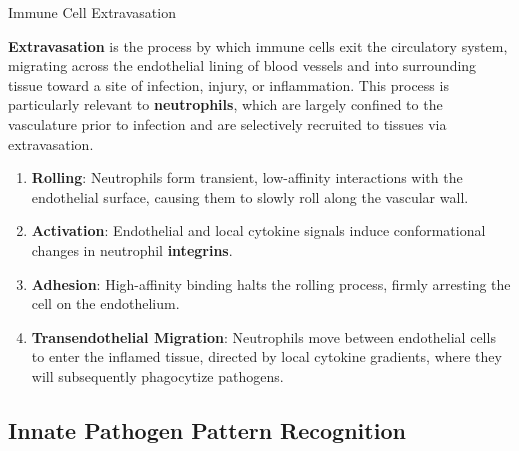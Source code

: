     \begin{core}{Immune Cell Extravasation}

      \textbf{Extravasation} is the process by which immune cells exit the circulatory system, migrating across the endothelial lining of blood vessels and into surrounding tissue toward a site of infection, injury, or inflammation. This process is particularly relevant to \textbf{neutrophils}, which are largely confined to the vasculature prior to infection and are selectively recruited to tissues via extravasation.


      \begin{enumerate}[label=(\arabic*)]

        \item \textbf{Rolling}: Neutrophils form transient, low-affinity interactions with the endothelial surface, causing them to slowly roll along the vascular wall.

        \item \textbf{Activation}: Endothelial and local cytokine signals induce conformational changes in neutrophil \textbf{integrins}.

        \item \textbf{Adhesion}: High-affinity binding halts the rolling process, firmly arresting the cell on the endothelium.

        \item \textbf{Transendothelial Migration}: Neutrophils move between endothelial cells to enter the inflamed tissue, directed by local cytokine gradients, where they will subsequently phagocytize pathogens.

      \end{enumerate}

    \end{core}

  \subsection{Innate Pathogen Pattern Recognition}

